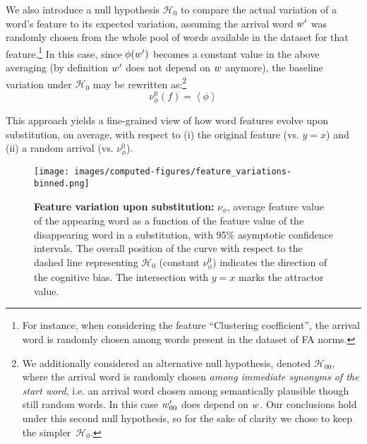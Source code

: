 We also introduce a null hypothesis $\mathcal{H}_0$ to compare the actual variation of a word's feature to its expected variation, assuming the arrival word $w'$ was randomly chosen from the whole pool of words available in the dataset for that feature.\footnote{For instance, when considering the feature ``Clustering coefficient'', the arrival word is randomly chosen among words present in the dataset of FA norms.}
In this case, since $\phi(w')$ becomes a constant value in the above averaging (by definition $w'$ does not depend on $w$ anymore),  the baseline variation under $\mathcal{H}_0$ may be rewritten as:\footnote{We additionally considered an alternative null hypothesis, denoted $\mathcal{H}_{00}$, where the arrival word is randomly chosen \emph{among immediate synonyms of the start word}, \hbox{i.e.} an arrival word chosen among semantically plausible though still random words. In this case $w'_{00}$ does depend on $w$. Our conclusions hold under this second null hypothesis, so for the sake of clarity we chose to keep the simpler~$\mathcal{H}_0$.}
$$\nu_{\phi}^0 (f) = \left<\phi\right>$$

This approach yields a fine-grained view of how word features evolve upon substitution, on average, with respect to (i) the original feature (\hbox{vs.} $y=x$) and (ii) a random arrival (\hbox{vs.} $\nu_{\phi}^0$).
\begin{figure*}[!th]
    \centering
    \texttt{[image: images/computed-figures/feature\_variations-binned.png]}
    \caption{\textbf{Feature variation upon substitution:} $\nu_\phi$, average feature value of the appearing word as a function of the feature value of the disappearing word in a substitution, with 95\% asymptotic confidence intervals.
    The overall position of the curve with respect to the dashed line representing $\mathcal{H}_0$ (constant $\nu_{\phi}^0$) indicates the direction of the cognitive bias.
    The intersection with $y = x$ marks the attractor value.
    }
    \label{fig:feature-variations}
\end{figure*}


